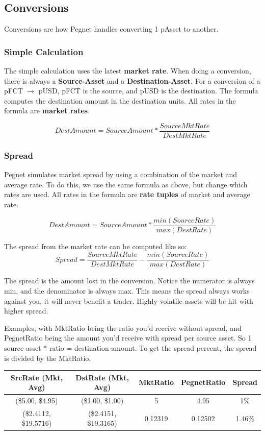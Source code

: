 \documentclass[12pt]{article}
\begin{document}
\pagebreak
\subsection{Conversions}
Conversions are how Pegnet handles converting 1 pAsset to another.

    \subsubsection{Simple Calculation}
    
    The simple calculation uses the latest {\bf market rate}. When doing a conversion, there is always a {\bf Source-Asset} and a {\bf Destination-Asset}. For a conversion of a pFCT $\rightarrow$ pUSD, pFCT is the source, and pUSD is the destination. The formula computes the destination amount in the destination units. All rates in the formula are {\bf market rates}.
    
    
    \large{\[
    DestAmount = SourceAmount * \frac{SourceMktRate}{DestMktRate}
    \]}


    \pagebreak
    \subsubsection{Spread}
    
    Pegnet simulates market spread by using a combination of the market and average rate. To do this, we use the same formula as above, but change which rates are used. All rates in the formula are {\bf rate tuples} of market and average rate.
    
    \large{\[
    DestAmount = SourceAmount * \frac{min(SourceRate)}{max(DestRate)}
    \]}
    
    The spread from the market rate can be computed like so:
    \large{\[
    Spread = \frac{SourceMktRate}{DestMktRate} - \frac{min(SourceRate)}{max(DestRate)}
    \]}
    
    The spread is the amount lost in the conversion. Notice the numerator is always min, and the denominator is always max. This means the spread always works against you, it will never benefit a trader. Highly volatile assets will be hit with higher spread.
    
    Examples, with MktRatio being the ratio you'd receive without spread, and PegnetRatio being the amount you'd receive with spread per source asset. So 1 source asset * ratio = destination amount. To get the spread percent, the spread is divided by the MktRatio.
    \begin{center}
    \begin{tabular}{ |c|c|c|c|c| } 
    \hline
    SrcRate (Mkt, Avg) & DstRate (Mkt, Avg) & MktRatio & PegnetRatio & Spread \\
    \hline
    \hline
     (\$5.00, \$4.95)  & (\$1.00, \$1.00) & 5 & 4.95 & 1\% \\ 
    \hline
     (\$2.4112, \$19.5716)  & (\$2.4151, \$19.3165) & 0.12319 & 0.12502 & 1.46\% \\ 
    \hline
    \end{tabular}
    \end{center}
\end{document}
